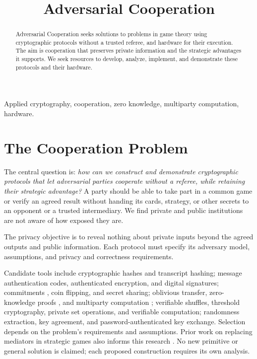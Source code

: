\documentclass[conference,letterpaper]{IEEEtran}
\title{Adversarial Cooperation}
\author{\IEEEauthorblockN{Santiago Restrepo}
\IEEEauthorblockA{\href{mailto:contact@waajacu.com}{contact@waajacu.com}\quad
\url{https://waajacu.com/}\\
\textit{Research proposal --- September 2026}}}
\date{}
\begin{document}
\maketitle

\begin{abstract}
Adversarial Cooperation seeks solutions to problems
in game theory using cryptographic protocols without a trusted referee,
and hardware for their execution. The aim is cooperation that preserves
private information and the strategic advantages it supports. We seek
resources to develop, analyze, implement, and demonstrate these protocols
and their hardware.
\end{abstract}

\begin{IEEEkeywords}
Applied cryptography, cooperation, zero knowledge, multiparty computation,
hardware.
\end{IEEEkeywords}

\section{The Cooperation Problem}
The central question is: \emph{how can we construct and demonstrate
cryptographic protocols that let adversarial parties cooperate without a
referee, while retaining their strategic advantage?}
A party should be able to take part in a common game or
verify an agreed result without handing its cards, strategy, or other secrets
to an opponent or a trusted intermediary. We find private and public
institutions are not aware of how exposed they are.

The privacy objective is to reveal nothing about private inputs beyond the
agreed outputs and public information. Each protocol must specify its
adversary model, assumptions, and privacy and correctness requirements.

Candidate tools include cryptographic hashes
and transcript hashing; message authentication codes, authenticated encryption,
and digital signatures; commitments \cite{naor1991}, coin flipping, and secret
sharing; oblivious transfer, zero-knowledge proofs \cite{gmr1989}, and multiparty
computation \cite{gmw1987}; verifiable shuffles, threshold cryptography, private
set operations, and verifiable computation; randomness extraction, key
agreement, and password-authenticated key exchange. Selection depends on the
problem's requirements and assumptions. Prior work on replacing mediators in
strategic games also informs this research \cite{dodis2000}.
No new primitive or general solution is claimed; each proposed
construction requires its own analysis.
\end{document}
